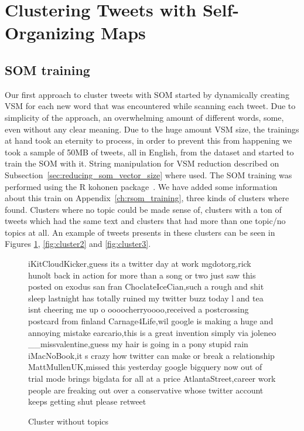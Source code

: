 
\section{Clustering Tweets with Self-Organizing Maps}
\label{ch:clustering_tweets}

\subsection{SOM training}
\label{sub:clustering_tweets_with_soms}
Our first approach to cluster tweets with \ac{SOM} started by dynamically creating \ac{VSM} for each new word that was encountered while scanning each tweet. Due to simplicity of the approach, an overwhelming amount of different words, some, even without any clear meaning. 
Due to the huge amount \ac{VSM} size, the trainings at hand took an eternity to process, in order to prevent this from happening we took a sample of 50MB of tweets, all in English, from the dataset and started to train the \ac{SOM} with it. String manipulation for \ac{VSM} reduction described on Subsection~\ref{sec:reducing_som_vector_size} where used.
The \ac{SOM} training was performed using the R kohonen package~\cite{rsom}. We have added some information about this train on Appendix~\ref{ch:rsom_training}, three kinds of clusters where found. Clusters where no topic could be made sense of, clusters with a ton of tweets which had the same text and clusters that had more than one topic/no topics at all. An example of tweets presents in these clusters can be seen in Figures \ref{fig:cluster1}, \ref{fig:cluster2} and \ref{fig:cluster3}.   
 \begin{figure}[htpb]
  \centering
    \begin{boxedverbatim}
    iKitCloudKicker,guess its a twitter day at work
    mgdotorg,rick hunolt back in action for more than a song or two just saw this posted on exodus san fran
    ChoclateIceCian,such a rough and shit sleep lastnight has totally ruined my twitter buzz today l and tea isnt cheering me up o
    oooocherryoooo,received a postcrossing postcard from finland
    Carnage4Life,wil google is making a huge and annoying mistake
    earcario,this is a great invention simply via joleneo
    __missvalentine,guess my hair is going in a pony stupid rain
    iMacNoBook,it s crazy how twitter can make or break a relationship
    MattMullenUK,missed this yesterday google bigquery now out of trial mode brings bigdata for all at a price
AtlantaStreet,career work people are freaking out over a conservative whose twitter account keeps getting shut please retweet
    \end{boxedverbatim}
    \caption{Cluster without topics}
    \label{fig:cluster1}
\end{figure} 
